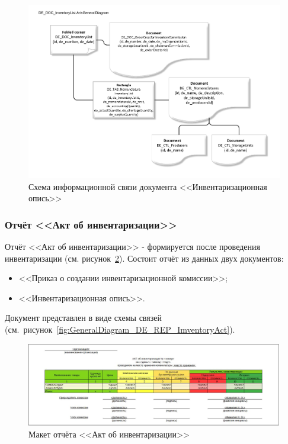 \begin{figure}[!h]
    \centering

    \includegraphics[width=18cm]
    {assets/ARIS/GeneralDiagram/DE_DOC_InventoryList.ArisGeneralDiagram.pdf}

    \caption{Схема информационной связи документа <<Инвентаризационная опись>>}

    \label{fig:GeneralDiagram_DE_DOC_InventoryList}
\end{figure}

\newpage
\subsubsection{Отчёт <<Акт об инвентаризации>>}

Отчёт <<Акт об инвентаризации>>
- формируется после проведения инвентаризации (см. рисунок~\ref{fig:OTC_ActNedoctachiTovara}).
Состоит отчёт из данных двух документов:
\begin{itemize}
    \item <<Приказ о создании инвентаризационной комиссии>>;
    \item <<Инвентаризационная опись>>.
\end{itemize}

Документ представлен в виде схемы связей (см.~рисунок~\ref{fig:GeneralDiagram_DE_REP_ImventoryAct}).

\begin{figure}[!h]
    \centering

    \includegraphics[width=18cm]
    {assets/layouts/OTC_ActNedoctachiTovara.jpg}

    \caption{Макет отчёта <<Акт об инвентаризации>>}
    
    \label{fig:OTC_ActNedoctachiTovara}
\end{figure}

